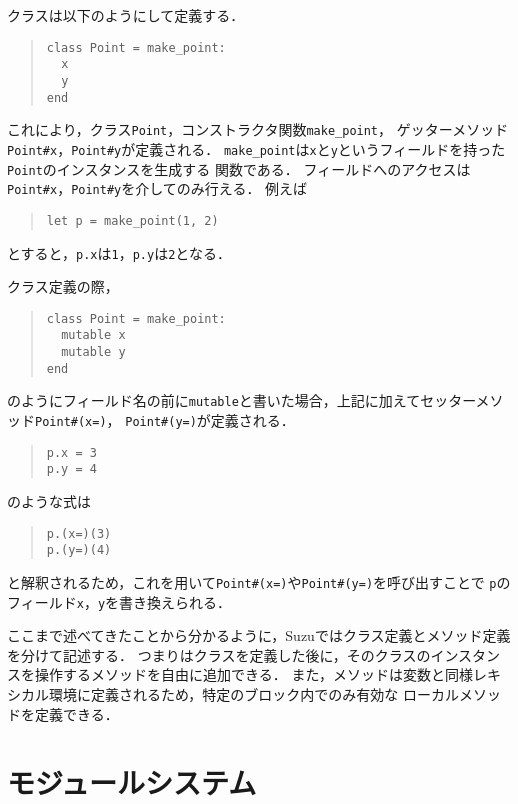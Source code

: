 \documentclass[a4paper,11pt,dvipdfmx]{jreport}
\begin{document}
クラスは以下のようにして定義する．
\begin{quote}
\begin{verbatim}
class Point = make_point:
  x
  y
end
\end{verbatim}
\end{quote}
これにより，クラス\verb|Point|，コンストラクタ関数\verb|make_point|，
ゲッターメソッド\verb|Point#x|，\verb|Point#y|が定義される．
\verb|make_point|は\verb|x|と\verb|y|というフィールドを持った\verb|Point|のインスタンスを生成する
関数である．
フィールドへのアクセスは\verb|Point#x|，\verb|Point#y|を介してのみ行える．
例えば
\begin{quote}
\begin{verbatim}
let p = make_point(1, 2)
\end{verbatim}
\end{quote}
とすると，\verb|p.x|は\verb|1|，\verb|p.y|は\verb|2|となる．

クラス定義の際，
\begin{quote}
\begin{verbatim}
class Point = make_point:
  mutable x
  mutable y
end
\end{verbatim}
\end{quote}
のようにフィールド名の前に\verb|mutable|と書いた場合，上記に加えてセッターメソッド\verb|Point#(x=)|，
\verb|Point#(y=)|が定義される．
\begin{quote}
\begin{verbatim}
p.x = 3
p.y = 4
\end{verbatim}
\end{quote}
のような式は
\begin{quote}
\begin{verbatim}
p.(x=)(3)
p.(y=)(4)
\end{verbatim}
\end{quote}
と解釈されるため，これを用いて\verb|Point#(x=)|や\verb|Point#(y=)|を呼び出すことで
\verb|p|のフィールド\verb|x|，\verb|y|を書き換えられる．

ここまで述べてきたことから分かるように，Suzuではクラス定義とメソッド定義を分けて記述する．
つまりはクラスを定義した後に，そのクラスのインスタンスを操作するメソッドを自由に追加できる．
また，メソッドは変数と同様レキシカル環境に定義されるため，特定のブロック内でのみ有効な
ローカルメソッドを定義できる．

\section{モジュールシステム}
\end{document}
